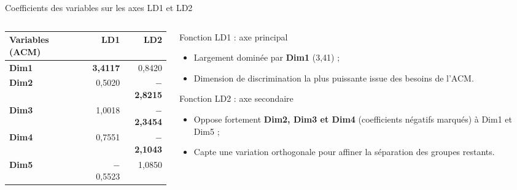 \documentclass[aspectratio=169, 10pt]{beamer}
\begin{document}
\begin{frame}{Coefficients des variables sur les axes LD1 et LD2}
    \begin{columns}[c]
        \begin{column}{0.48\textwidth}
            \begin{center}
                \footnotesize
                \renewcommand{\arraystretch}{1.2}
                \begin{tabular}{l|rr}
                    \toprule
                    \textbf{Variables (ACM)} & \textbf{LD1} & \textbf{LD2} \\
                    \midrule
                    \textbf{Dim1} & \cellcolor{red!15}\textbf{3,4117} & 0,8420 \\
                    \rowcolor{gray!5}
                    \textbf{Dim2} & 0,5020 & \cellcolor{blue!15}\textbf{$-$2,8215} \\
                    \textbf{Dim3} & 1,0018 & \cellcolor{blue!15}\textbf{$-$2,3454} \\
                    \rowcolor{gray!5}
                    \textbf{Dim4} & 0,7551 & \cellcolor{blue!15}\textbf{$-$2,1043} \\
                    \textbf{Dim5} & $-$0,5523 & 1,0850 \\
                    \bottomrule
                \end{tabular}
            \end{center}
        \end{column}
        \begin{column}{0.5\textwidth}
            \begin{block}{Fonction LD1 : axe principal}
                \begin{itemize}
                    \scriptsize
                    \item Largement dominée par \textbf{Dim1} (3,41) ;
                    \item Dimension de discrimination la plus puissante issue des besoins de l'ACM.
                \end{itemize}
            \end{block}
            \begin{block}{Fonction LD2 : axe secondaire}
                \begin{itemize}
                    \scriptsize
                    \item Oppose fortement \textbf{Dim2, Dim3 et Dim4} (coefficients négatifs marqués) à Dim1 et Dim5 ;
                    \item Capte une variation orthogonale pour affiner la séparation des groupes restants.
                \end{itemize}
            \end{block}
        \end{column}
    \end{columns}
\end{frame}
\end{document}
